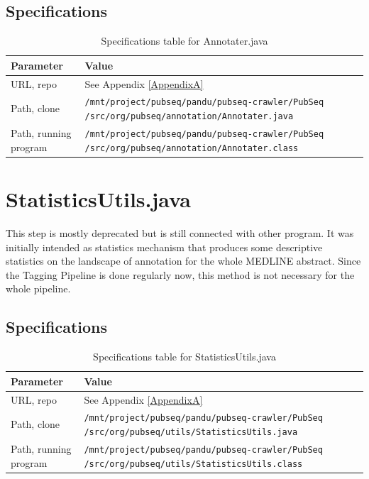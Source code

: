 \subsection{Specifications}

\begin{table}[htbp]
\caption{Specifications table for Annotater.java}
\centering
\begin{tabularx}{\textwidth}{ | l | X | }
  \hline
  Parameter & Value \\
  \hline
  URL, repo & See Appendix \ref{AppendixA} \\
  Path, clone & \texttt{/mnt/project/pubseq/pandu/pubseq-crawler/PubSeq /src/org/pubseq/annotation/Annotater.java} \\
  Path, running program & \texttt{/mnt/project/pubseq/pandu/pubseq-crawler/PubSeq /src/org/pubseq/annotation/Annotater.class}\\
  \hline
\end{tabularx}
\end{table}


\section{StatisticsUtils.java}


This step is mostly deprecated but is still connected with other program. It was initially intended as statistics mechanism that produces some descriptive statistics on the landscape of annotation for the whole MEDLINE abstract. Since the Tagging Pipeline is done regularly now, this method is not necessary for the whole pipeline.

\subsection{Specifications}

\begin{table}[htbp]
\caption{Specifications table for StatisticsUtils.java}
\centering
\begin{tabularx}{\textwidth}{ | l | X | }
  \hline
  Parameter & Value \\
  \hline
  URL, repo & See Appendix \ref{AppendixA} \\
  Path, clone & \texttt{/mnt/project/pubseq/pandu/pubseq-crawler/PubSeq /src/org/pubseq/utils/StatisticsUtils.java} \\
  Path, running program & \texttt{/mnt/project/pubseq/pandu/pubseq-crawler/PubSeq /src/org/pubseq/utils/StatisticsUtils.class}\\
  \hline
\end{tabularx}
\end{table}

